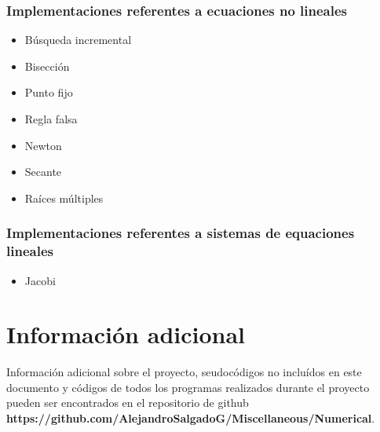 \documentclass{article}
\begin{document}
\subsubsection{Implementaciones referentes a ecuaciones no lineales}

\begin{itemize}
    \item Búsqueda incremental
    \item Bisección
    \item Punto fijo
    \item Regla falsa
    \item Newton
    \item Secante
    \item Raíces múltiples
\end{itemize}

\subsubsection{Implementaciones referentes a sistemas de equaciones
lineales}

\begin{itemize}
    \item Jacobi
\end{itemize}

\section{Información adicional}

Información adicional sobre el proyecto, seudocódigos no incluídos en
este documento y códigos de todos los programas realizados durante el
proyecto pueden ser encontrados en el repositorio de github\\
\textbf{https://github.com/AlejandroSalgadoG/Miscellaneous/Numerical}.
\end{document}

